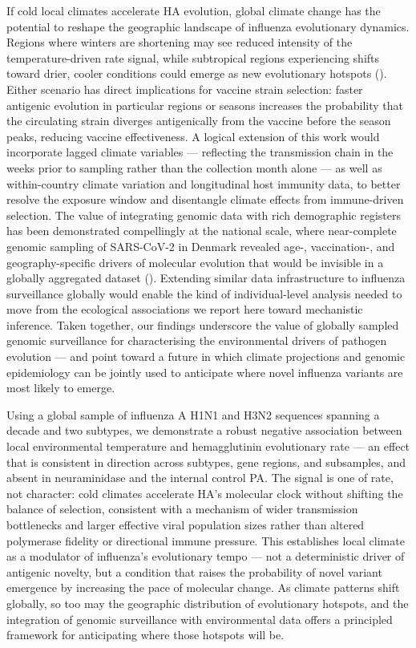 \documentclass{pnas-new}
\begin{document}
If cold local climates accelerate HA evolution, global climate change has the potential to reshape the geographic landscape of influenza evolutionary dynamics. Regions where winters are shortening may see reduced intensity of the temperature-driven rate signal, while subtropical regions experiencing shifts toward drier, cooler conditions could emerge as new evolutionary hotspots (\cite{baker_implications_2021}). Either scenario has direct implications for vaccine strain selection: faster antigenic evolution in particular regions or seasons increases the probability that the circulating strain diverges antigenically from the vaccine before the season peaks, reducing vaccine effectiveness. A logical extension of this work would incorporate lagged climate variables — reflecting the transmission chain in the weeks prior to sampling rather than the collection month alone — as well as within-country climate variation and longitudinal host immunity data, to better resolve the exposure window and disentangle climate effects from immune-driven selection. The value of integrating genomic data with rich demographic registers has been demonstrated compellingly at the national scale, where near-complete genomic sampling of SARS-CoV-2 in Denmark revealed age-, vaccination-, and geography-specific drivers of molecular evolution that would be invisible in a globally aggregated dataset (\cite{khurana_high-resolution_2024}). Extending similar data infrastructure to influenza surveillance globally would enable the kind of individual-level analysis needed to move from the ecological associations we report here toward mechanistic inference. Taken together, our findings underscore the value of globally sampled genomic surveillance for characterising the environmental drivers of pathogen evolution — and point toward a future in which climate projections and genomic epidemiology can be jointly used to anticipate where novel influenza variants are most likely to emerge. 

Using a global sample of influenza A H1N1 and H3N2 sequences spanning a decade and two subtypes, we demonstrate a robust negative association between local environmental temperature and hemagglutinin evolutionary rate — an effect that is consistent in direction across subtypes, gene regions, and subsamples, and absent in neuraminidase and the internal control PA. The signal is one of rate, not character: cold climates accelerate HA's molecular clock without shifting the balance of selection, consistent with a mechanism of wider transmission bottlenecks and larger effective viral population sizes rather than altered polymerase fidelity or directional immune pressure. This establishes local climate as a modulator of influenza's evolutionary tempo — not a deterministic driver of antigenic novelty, but a condition that raises the probability of novel variant emergence by increasing the pace of molecular change. As climate patterns shift globally, so too may the geographic distribution of evolutionary hotspots, and the integration of genomic surveillance with environmental data offers a principled framework for anticipating where those hotspots will be.
\end{document}
